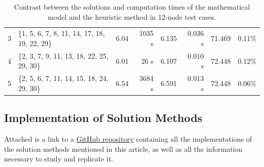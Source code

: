 \documentclass{amsart}
\begin{document}
\begin{table}[h!]
\begin{tabular}{llrrrrrr}
                3 & \{1, 5, 6, 7, 8, 11, 14, 17, 18, 19, 22, 29\}   & 6.04 & 1035 s  & 6.135 & 0.036 s & 71.469 & 0.11\% \\
                4 & \{2, 3, 7, 9, 11, 13, 18, 22, 25, 29, 30\} & 6.01 & 26 s  & 6.107 & 0.010 s & 72.448  & 0.12\% \\
                5 & \{2, 5, 6, 7, 11, 14, 15, 18, 24, 29, 30\}  & 6.54 & 3684 s  & 6.591 & 0.013 s & 72.448 & 0.06\% \\
                \bottomrule
                \end{tabular}
                \vspace{10pt}
                \caption{Contrast between the solutions and computation times of the mathematical model and the heuristic method in 12-node test cases.} \label{tab:12nodos}
            \end{table}
        
        

        \subsection{Implementation of Solution Methods}
        Attached is a link to a \underline{\href{https://github.com/JuanjoBelt/VRP-ReforestationTransportLogistics}{GitHub repository}} containing all the implementations of the solution methods mentioned in this article, as well as all the information necessary to study and replicate it.
        

    
 
\end{document}
